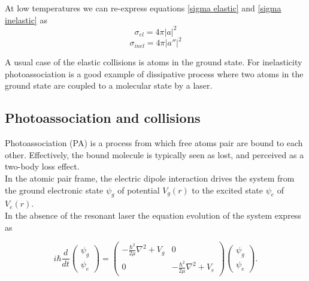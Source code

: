 At low temperatures we can re-express equations \ref{sigma elastic} and \ref{sigma inelastic} as
\begin{equation}
    \sigma_{el} = 4\pi|a|^2
\end{equation}
\begin{equation}
    \sigma_{inel} = 4\pi|a''|^2
\end{equation}

A usual case of the elastic collisions is atoms in the ground 
state. For inelasticity photoassociation is a good example of
dissipative process where two atoms in the ground state are coupled to a molecular state by a laser.

\subsection{Photoassociation and collisions}
Photoassociation (PA) is a process from which free atoms pair are bound to each other. Effectively, the bound 
molecule is typically seen as lost, and perceived as a two-body loss effect. \\
In the atomic pair frame, the electric dipole interaction drives the system from the ground electronic state
$\psi_g$ of potential $V_g(r)$ to the excited state $\psi_e$ of $V_e(r)$. \\
In the absence of the resonant laser the equation evolution of the system express as

\begin{equation}
    i\hbar \frac{d}{dt}
    \begin{pmatrix}
        \psi_g\\
        \psi_e
    \end{pmatrix}
    =
    \begin{pmatrix}
        -\frac{\hbar^2}{2\mu}\nabla^2 + V_g & 0\\
        0 & -\frac{\hbar^2}{2\mu}\nabla^2 + V_e 
    \end{pmatrix}
    \begin{pmatrix}
        \psi_g\\
        \psi_e
    \end{pmatrix}.
    \label{elastic evolution equation}
\end{equation}

